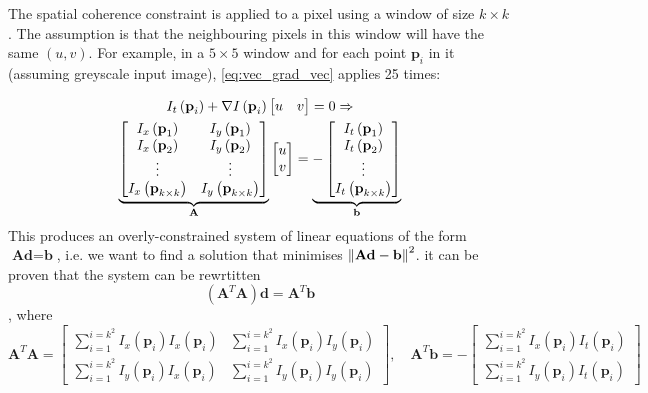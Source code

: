 \documentclass[a4paper]{article}
\begin{document}
The spatial coherence constraint is applied to a pixel using a window of size $k\times k$. The assumption is that the neighbouring pixels in this window will have the same $(u,v)$. For example, in a $5\times5$ window and for each point $\textbf{p}_i$ in it (assuming greyscale input image), \eqref{eq:vec_grad_vec} applies 25 times:

\begin{gather}
I_t\left(\textbf{p}_i\right) + \nabla I\left(\textbf{p}_i\right)\begin{bmatrix}
 u & v\end{bmatrix} = 0 \Rightarrow \\
\underbrace{ \begin{bmatrix} 
 I_x\left(\textbf{p}_1 \right) & I_y\left(\textbf{p}_1 \right) \\
 I_x\left(\textbf{p}_2 \right) & I_y\left(\textbf{p}_2 \right) \\
 \vdots & \vdots \\
 I_x\left(\textbf{p}_{k\times k} \right) & I_y\left(\textbf{p}_{k\times k} \right)
 \end{bmatrix} }
 _{\textbf{A}}
 \begin{bmatrix}
 u \\ v
 \end{bmatrix} = 
 \underbrace{- \begin{bmatrix}
 I_t\left(\textbf{p}_1 \right)\\
 I_t\left(\textbf{p}_2 \right) \\
 \vdots \\
 I_t\left(\textbf{p}_{k \times k} \right)
 \end{bmatrix}}
 _{\textbf{b}}
\end{gather}
This produces an overly-constrained system of linear equations of the form $\textbf{Ad} = \textbf{b}$, i.e. we want to find a solution that minimises $\left\lVert\textbf{Ad} -\textbf{b}\right\rVert^2$. it can be proven that the system can be rewrtitten
\[
(\textbf{A}^T\textbf{A})\textbf{d} = \textbf{A}^T\textbf{b}
\]
, where
\begin{equation}
    \textbf{A}^T\textbf{A} = 
    \begin{bmatrix}
        \sum\limits_{i=1}^{i=k^2}I_x\left(\textbf{p}_i\right)I_x\left(\textbf{p}_i\right) & \sum\limits_{i=1}^{i=k^2}I_x\left(\textbf{p}_i\right)I_y\left(\textbf{p}_i\right) \\
        \sum\limits_{i=1}^{i=k^2}I_y\left(\textbf{p}_i\right)I_x\left(\textbf{p}_i\right) & \sum\limits_{i=1}^{i=k^2}I_y\left(\textbf{p}_i\right)I_y\left(\textbf{p}_i\right)
    \end{bmatrix}, \quad
    \textbf{A}^T\textbf{b} = -
    \begin{bmatrix}
    \sum\limits_{i=1}^{i=k^2}I_x\left(\textbf{p}_i\right)I_t\left(\textbf{p}_i\right)   \\ 
    \sum\limits_{i=1}^{i=k^2}I_y\left(\textbf{p}_i\right)I_t\left(\textbf{p}_i\right) 
    \end{bmatrix}
\end{equation}
\end{document}
